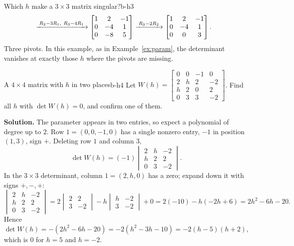 \documentclass[11pt]{article}
\begin{document}
\begin{exmp}{Which $h$ make a $3\times3$ matrix singular?}{b-h3}
\begin{align*}
&\xrightarrow{\;R_2-3R_1,\ R_3-4R_1\;}
\begin{bmatrix}1&2&-1\\0&-4&1\\0&-8&5\end{bmatrix}
\xrightarrow{\;R_3-2R_2\;}
\begin{bmatrix}1&2&-1\\0&-4&1\\0&0&3\end{bmatrix}.
\end{align*}
Three pivots. In this example, as in Example~\ref{ex:param}, the determinant vanishes at exactly those $h$ where the pivots are missing.
\end{exmp}

\begin{exmp}{A $4\times4$ matrix with $h$ in two places}{b-h4}
Let $W(h)=\begin{bmatrix}0&0&-1&0\\2&h&2&-2\\h&2&0&2\\0&3&3&-2\end{bmatrix}$. Find all $h$ with $\det W(h)=0$, and confirm one of them.

\textbf{Solution.} The parameter appears in two entries, so expect a polynomial of degree up to $2$. Row $1=(0,0,-1,0)$ has a single nonzero entry, $-1$ in position $(1,3)$, sign $+$. Deleting row $1$ and column $3$,
\[
\det W(h)=(-1)\begin{vmatrix}2&h&-2\\h&2&2\\0&3&-2\end{vmatrix}.
\]
In the $3\times3$ determinant, column $1=(2,h,0)$ has a zero; expand down it with signs $+,-,+$:
\[
\begin{vmatrix}2&h&-2\\h&2&2\\0&3&-2\end{vmatrix}=2\begin{vmatrix}2&2\\3&-2\end{vmatrix}-h\begin{vmatrix}h&-2\\3&-2\end{vmatrix}+0=2(-10)-h(-2h+6)=2h^2-6h-20.
\]
Hence $\det W(h)=-(2h^2-6h-20)=-2(h^2-3h-10)=-2(h-5)(h+2)$, which is $0$ for $h=5$ and $h=-2$.


\end{exmp}
\end{document}
